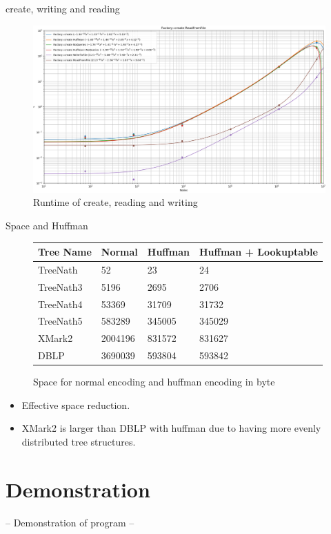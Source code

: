\documentclass{beamer}
\begin{document}
\begin{frame}{create, writing and reading}
	\begin{figure}[H]
	\includegraphics[scale=0.25]{file_compare_cut}
	\caption{Runtime of create, reading and writing}
	\label{complexQue:image1}
	\end{figure}
\end{frame}

\begin{frame}{Space and Huffman}
	\begin{figure}[h]
	\begin{tabular}{ |p{2cm}||p{1.7cm}|p{1.7cm}|p{4cm}|  }
		 \hline
		 Tree Name & Normal &Huffman &Huffman + Lookuptable\\
		 \hline
		 TreeNath   & 52    & 23 &   24 \\
		 TreeNath3&5196 &2695&  2706\\
		 TreeNath4&53369& 31709&  31732\\
		 TreeNath5&583289&345005&345029\\
		 XMark2&2004196&831572&831627\\
		 DBLP&3690039&593804&593842\\
		 \hline
	\end{tabular}
	\caption{Space for normal encoding and huffman encoding in byte}
	\label{huff:table1}
	\end{figure}
	\begin{itemize}
	\item
		Effective space reduction.
	\item
		XMark2 is larger than DBLP with huffman due to having more evenly distributed tree structures.
	\end{itemize}
\end{frame}

\section{Demonstration}
\begin{frame}
	-- Demonstration of program --
\end{frame}
\end{document}
